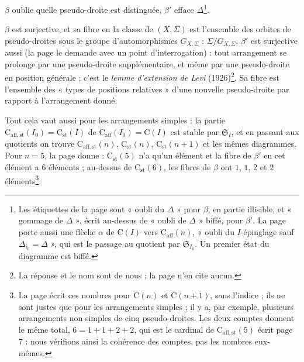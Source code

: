 \documentclass[11pt,a4paper]{article}
\begin{document}

$\beta$ oublie quelle pseudo-droite est distinguée, $\beta'$ efface
$\Delta$\footnote{Les étiquettes de la page sont « oubli du $\Delta$ » pour
$\beta$, en partie illisible, et « gommage de $\Delta$ », écrit au-dessus de
« oubli de $\Delta$ » biffé, pour $\beta'$. La page porte aussi une flèche
$\alpha$ de $\mathrm{C}(I)$ vers $\mathrm{C}_{\mathrm{aff}}(n)$, « oubli du
$I$-épinglage sauf $\Delta_{i_0} = \Delta$ », qui est le passage au quotient
par $\mathfrak{S}_{I_0}$. Un premier état du diagramme est biffé.}.

$\beta$ est surjective, et sa fibre en la classe de $(X, \Sigma)$ est
l'ensemble des orbites de pseudo-droites sous le groupe d'automorphismes
$G_{X,\Sigma}$ : $\Sigma / G_{X,\Sigma}$. $\beta'$ est surjective aussi
(la page le demande avec un point d'interrogation) : tout arrangement se
prolonge par une pseudo-droite supplémentaire, et même par une pseudo-droite
en position générale ; c'est le \emph{lemme d'extension de Levi}
(1926)\footnote{La réponse et le nom sont de nous ; la page n'en cite
aucun.}. Sa fibre est l'ensemble des « types de positions relatives » d'une
nouvelle pseudo-droite par rapport à l'arrangement donné.

Tout cela vaut aussi pour les arrangements simples : la partie
$\mathrm{C}_{\mathrm{aff,st}}(I_0) = \mathrm{C}_{\mathrm{st}}(I)$ de
$\mathrm{C}_{\mathrm{aff}}(I_0) = \mathrm{C}(I)$ est stable par
$\mathfrak{S}_I$, et en passant aux quotients on trouve
$\mathrm{C}_{\mathrm{aff,st}}(n)$, $\mathrm{C}_{\mathrm{st}}(n)$,
$\mathrm{C}_{\mathrm{st}}(n+1)$ et les mêmes diagrammes. Pour $n = 5$, la
page donne : $\mathrm{C}_{\mathrm{st}}(5)$ n'a qu'un élément et la fibre de
$\beta'$ en cet élément a $6$ éléments ; au-dessus de
$\mathrm{C}_{\mathrm{st}}(6)$, les fibres de $\beta$ ont $1$, $1$, $2$ et $2$
éléments\footnote{La page écrit ces nombres pour $\mathrm{C}(n)$ et
$\mathrm{C}(n+1)$, sans l'indice ; ils ne sont justes que pour les
arrangements simples ; il y a, par exemple, plusieurs arrangements non
simples de cinq pseudo-droites. Les deux comptes donnent le même total,
$6 = 1 + 1 + 2 + 2$, qui est le cardinal de
$\mathrm{C}_{\mathrm{aff,st}}(5)$ écrit page 7 : nous vérifions ainsi la
cohérence des comptes, pas les nombres eux-mêmes.}.
\end{document}
